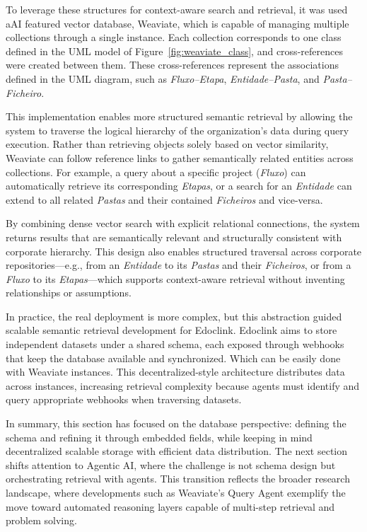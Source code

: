 To leverage these structures for context-aware search and retrieval, it was used a\gls{AI} featured vector database, Weaviate, which is capable of managing multiple collections through a single instance. Each collection corresponds to one class defined in the UML model of Figure~\ref{fig:weaviate_class}, and cross-references were created between them. These cross-references represent the associations defined in the UML diagram, such as \textit{Fluxo--Etapa}, \textit{Entidade--Pasta}, and \textit{Pasta--Ficheiro}.

This implementation enables more structured semantic retrieval by allowing the system to traverse the logical hierarchy of the organization’s data during query execution. Rather than retrieving objects solely based on vector similarity, Weaviate can follow reference links to gather semantically related entities across collections. For example, a query about a specific project (\textit{Fluxo}) can automatically retrieve its corresponding \textit{Etapas}, or a search for an \textit{Entidade} can extend to all related \textit{Pastas} and their contained \textit{Ficheiros} and vice-versa.

By combining dense vector search with explicit relational connections, the system returns results that are semantically relevant and structurally consistent with corporate hierarchy. This design also enables structured traversal across corporate repositories—e.g., from an \textit{Entidade} to its \textit{Pastas} and their \textit{Ficheiros}, or from a \textit{Fluxo} to its \textit{Etapas}—which supports context-aware retrieval without inventing relationships or assumptions.

In practice, the real deployment is more complex, but this abstraction guided scalable semantic retrieval development for Edoclink.
Edoclink aims to store independent datasets under a shared schema, each exposed through webhooks that keep the database available and synchronized. Which can be easily done with Weaviate instances. This decentralized-style architecture distributes data across instances, increasing retrieval complexity because agents must identify and query appropriate webhooks when traversing datasets.

In summary, this section has focused on the database perspective: defining the schema and refining it through embedded fields, while keeping in mind decentralized scalable storage with efficient data distribution. The next section shifts attention to Agentic AI, where the challenge is not schema design but orchestrating retrieval with agents. This transition reflects the broader research landscape, where developments such as Weaviate's Query Agent \cite{weaviate} exemplify the move toward automated reasoning layers capable of multi-step retrieval and problem solving. 

